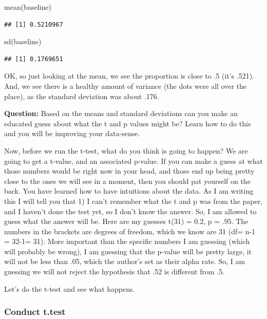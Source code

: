 \documentclass[
]{book}
\newenvironment{Shaded}{\begin{snugshade}}{\end{snugshade}}
\newcommand{\FunctionTok}[1]{\textcolor[rgb]{0.00,0.00,0.00}{#1}}
\newcommand{\NormalTok}[1]{#1}
\begin{document}
\begin{Shaded}
\begin{Highlighting}[]
\FunctionTok{mean}\NormalTok{(baseline)}
\end{Highlighting}
\end{Shaded}

\begin{verbatim}
## [1] 0.5210967
\end{verbatim}

\begin{Shaded}
\begin{Highlighting}[]
\FunctionTok{sd}\NormalTok{(baseline)}
\end{Highlighting}
\end{Shaded}

\begin{verbatim}
## [1] 0.1769651
\end{verbatim}

OK, so just looking at the mean, we see the proportion is close to .5 (it's .521). And, we see there is a healthy amount of variance (the dots were all over the place), as the standard deviation was about .176.

\textbf{Question:} Based on the means and standard deviations can you make an educated guess about what the t and p values might be? Learn how to do this and you will be improving your data-sense.

Now, before we run the t-test, what do you think is going to happen? We are going to get a t-value, and an associated p-value. If you can make a guess at what those numbers would be right now in your head, and those end up being pretty close to the ones we will see in a moment, then you should pat yourself on the back. You have learned how to have intuitions about the data. As I am writing this I will tell you that 1) I can't remember what the t and p was from the paper, and I haven't done the test yet, so I don't know the answer. So, I am allowed to guess what the answer will be. Here are my guesses t(31) = 0.2, p = .95. The numbers in the brackets are degrees of freedom, which we know are 31 (df= n-1 = 32-1= 31). More important than the specific numbers I am guessing (which will probably be wrong), I am guessing that the p-value will be pretty large, it will not be less than .05, which the author's set as their alpha rate. So, I am guessing we will not reject the hypothesis that .52 is different from .5.

Let's do the t-test and see what happens.

\hypertarget{conduct-t.test}{%
\subsubsection{Conduct t.test}\label{conduct-t.test}}
\end{document}

